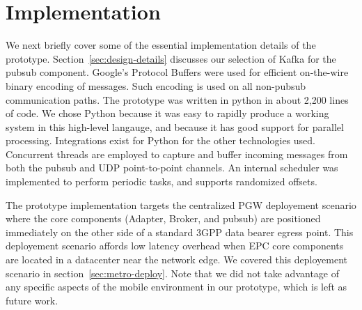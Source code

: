 \section{Implementation}

We next briefly cover some of the essential implementation details of
the \name prototype. Section~\ref{sec:design-details} discusses our
selection of Kafka for the pubsub component. Google's Protocol Buffers
were used for efficient on-the-wire binary encoding of messages. Such
encoding is used on all non-pubsub communication paths. The \name
prototype was written in python in about 2,200 lines of code. We chose
Python because it was easy to rapidly produce a working system in this
high-level langauge, and because it has good support for parallel
processing. Integrations exist for Python for the other technologies
used. Concurrent threads are employed to capture and buffer incoming
messages from both the pubsub and UDP point-to-point channels. An
internal scheduler was implemented to perform periodic tasks, and
supports randomized offsets.

The prototype implementation targets the centralized PGW deployement
scenario where the core \name components (Adapter, Broker, and
pubsub) are positioned immediately on the other side of a standard
3GPP data bearer egress point. This deployement scenario affords low
latency overhead when EPC core components are located in a datacenter
near the network edge.  We covered this deployement scenario in
section~\ref{sec:metro-deploy}.  Note that we did not take advantage
of any specific aspects of the mobile environment in our prototype,
which is left as future work.
